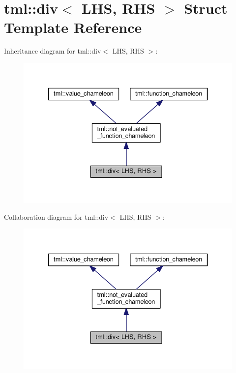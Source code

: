 \hypertarget{structtml_1_1div}{\section{tml\+:\+:div$<$ L\+H\+S, R\+H\+S $>$ Struct Template Reference}
\label{structtml_1_1div}
}


Inheritance diagram for tml\+:\+:div$<$ L\+H\+S, R\+H\+S $>$\+:
\nopagebreak
\begin{figure}[H]
\begin{center}
\leavevmode
\includegraphics[width=333pt]{structtml_1_1div__inherit__graph}
\end{center}
\end{figure}


Collaboration diagram for tml\+:\+:div$<$ L\+H\+S, R\+H\+S $>$\+:
\nopagebreak
\begin{figure}[H]
\begin{center}
\leavevmode
\includegraphics[width=333pt]{structtml_1_1div__coll__graph}
\end{center}
\end{figure}
